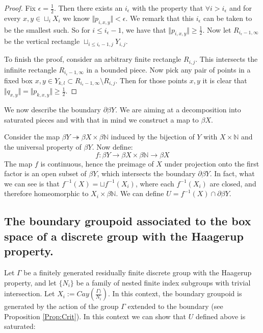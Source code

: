\begin{example}
\begin{proof}
Fix $\epsilon = \frac{1}{2}$. Then there exists an $i_{\epsilon}$ with the property that $\forall i>i_{\epsilon}$ and for every $x,y \in \sqcup_{i}X_{i}$ we know $\Vert p_{i,x,y} \Vert < \epsilon$. We remark that this $i_{\epsilon}$ can be taken to be the smallest such. So for $i \leq i_{\epsilon}-1$, we have that $\Vert p_{i,x,y} \Vert \geq \frac{1}{2}$. Now let $R_{i_{\epsilon}-1,\infty}$ be the vertical rectangle $\sqcup_{i\leq i_{\epsilon}-1,j} Y_{i,j}$. 

To finish the proof, consider an arbitrary finite rectangle $R_{i,j}$. This intersects the infinite rectangle $R_{i_{\epsilon}-1,\infty}$ in a bounded piece. Now pick any pair of points in a fixed box $x,y \in Y_{k,l} \subset R_{i_{\epsilon}-1,\infty} \setminus R_{i,j}$. Then for those points $x,y$ it is clear that $\Vert q_{x,y} \Vert = \Vert p_{k,x,y}\Vert \geq \frac{1}{2}$.
\end{proof}

We now describe the boundary $\partial\beta Y$. We are aiming at a decomposition into saturated pieces and with that in mind we construct a map to $\beta X$.

Consider the map $\beta Y \twoheadrightarrow \beta X \times \beta \mathbb{N}$ induced by the bijection of $Y$ with $X \times \mathbb{N}$ and the universal property of $\beta Y$. Now define:
\begin{equation*}
f: \beta Y \rightarrow \beta X \times \beta \mathbb{N} \rightarrow \beta X
\end{equation*}
The map $f$ is continuous, hence the preimage of $X$ under projection onto the first factor is an open subset of $\beta Y$, which intersects the boundary $\partial \beta Y$. In fact, what we can see is that $f^{-1}(X)= \sqcup f^{-1}(X_{i})$, where each $f^{-1}(X_{i})$ are closed, and therefore homeomorphic to $X_{i} \times \beta \mathbb{N}$. We can define $U = f^{-1}(X)\cap \partial\beta Y$.

\subsection{The boundary groupoid associated to the box space of a discrete group with the Haagerup property.}

Let $\Gamma$ be a finitely generated residually finite discrete group with the Haagerup property, and let $\lbrace N_{i}\rbrace$ be a family of nested finite index subgroups with trivial intersection. Let $X_{i}:=Cay(\frac{\Gamma)}{N_{i}})$. In this context, the boundary groupoid is generated by the action of the group $\Gamma$ extended to the boundary (see Proposition \ref{Prop:Crit}). In this context we can show that $U$ defined above is saturated:


\end{example}
